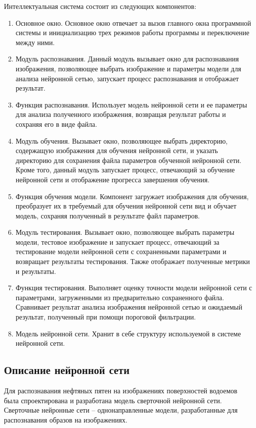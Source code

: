 Интеллектуальная система состоит из следующих компонентов:
\begin{enumerate}
	\item Основное окно. Основное окно отвечает за вызов главного окна программной системы и инициализацию трех режимов работы программы и переключение между ними.
	\item Модуль распознавания. Данный модуль вызывает окно для распознавания изображения, позволяющее выбрать изображение и параметры модели для анализа нейронной сетью, запускает процесс распознавания и отображает результат.
	\item Функция распознавания. Использует модель нейронной сети и ее параметры для анализа полученного изображения, возвращая результат работы и сохраняя его в виде файла.
	\item Модуль обучения. Вызывает окно, позволяющее выбрать директорию, содержащую изображения для обучения нейронной сети, и указать директорию для сохранения файла параметров обученной нейронной сети. Кроме того, данный модуль запускает процесс, отвечающий за обучение нейронной сети и отображение прогресса завершения обучения. 
	\item Функция обучения модели. Компонент загружает изображения для обучения, преобразует их в требуемый для обучения нейронной сети вид и обучает модель, сохраняя полученный в результате файл параметров.
	\item Модуль тестирования. Вызывает окно, позволяющее выбрать параметры модели, тестовое изображение и запускает процесс, отвечающий за тестирование модели нейронной сети с сохраненными параметрами и возвращает результаты тестирования. Также отображает полученные метрики и результаты.
	\item Функция тестирования. Выполняет оценку точности модели нейронной сети с параметрами, загруженными из предварительно сохраненного файла. Сравнивает результат анализа изображения нейронной сетью и ожидаемый результат, полученный при помощи пороговой фильтрации.
	\item Модель нейронной сети. Хранит в себе структуру используемой в системе нейронной сети. 
\end{enumerate}

\subsection{Описание нейронной сети}

Для распознавания нефтяных пятен на изображениях поверхностей водоемов была спроектирована и разработана модель сверточной нейронной сети. Сверточные нейронные сети -- однонаправленные модели, разработанные для распознавания образов на изображениях. 


